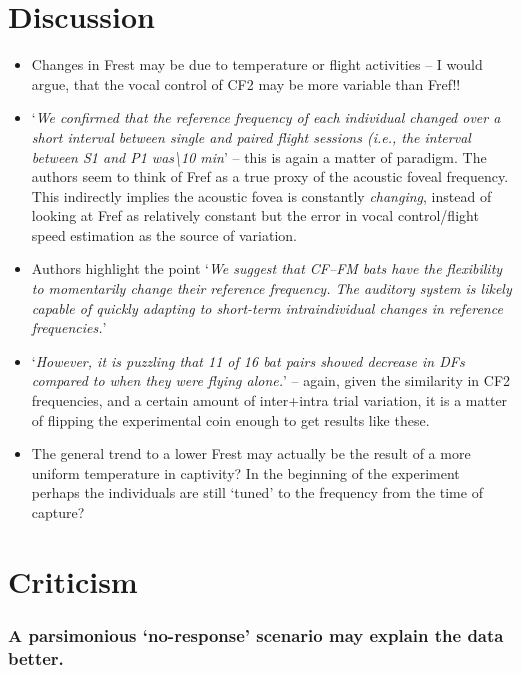 \documentclass[
]{book}
\providecommand{\tightlist}{%
  \setlength{\itemsep}{0pt}\setlength{\parskip}{0pt}}
\begin{document}
\hypertarget{discussion-8}{%
\section{Discussion}\label{discussion-8}}

\begin{itemize}
\tightlist
\item
  Changes in Frest may be due to temperature or flight activities -- I would argue, that the vocal control of CF2 may be more variable than Fref!!
\item
  `\emph{We confirmed that the reference frequency of each individual changed over a short interval between
  single and paired flight sessions (i.e., the interval between S1 and P1 was\textbackslash10 min}' -- this is again a matter of paradigm. The authors seem to think of Fref as a true proxy of the acoustic foveal frequency. This indirectly implies the acoustic fovea is constantly \emph{changing}, instead of looking at Fref as relatively constant but the error in vocal control/flight speed estimation as the source of variation.
\item
  Authors highlight the point `\emph{We suggest that CF--FM bats have the flexibility to momentarily change their reference frequency. The auditory system is likely capable of quickly adapting to short-term intraindividual changes in reference frequencies.}'
\item
  `\emph{However, it is puzzling that 11 of 16 bat pairs showed decrease in DFs compared to when they were flying alone.}' -- again, given the similarity in CF2 frequencies, and a certain amount of inter+intra trial variation, it is a matter of flipping the experimental coin enough to get results like these.
\item
  The general trend to a lower Frest may actually be the result of a more uniform temperature in captivity? In the beginning of the experiment perhaps the individuals are still `tuned' to the frequency from the time of capture?
\end{itemize}

\hypertarget{criticism}{%
\section{Criticism}\label{criticism}}

\hypertarget{a-parsimonious-no-response-scenario-may-explain-the-data-better.}{%
\subsubsection{A parsimonious `no-response' scenario may explain the data better.}\label{a-parsimonious-no-response-scenario-may-explain-the-data-better.}}
\end{document}
